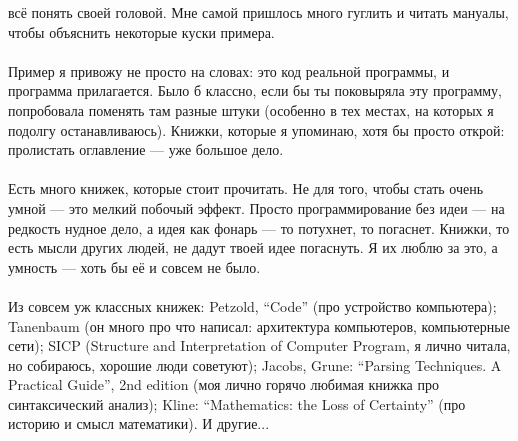 \documentclass[11pt]{book}
\begin{document}
всё понять своей головой.
Мне самой пришлось много гуглить и читать мануалы, чтобы объяснить некоторые куски примера.
\\ \\
Пример я привожу не просто на словах: это код реальной программы, и программа прилагается.
Было б классно, если бы ты поковыряла эту программу, попробовала поменять там разные штуки
(особенно в тех местах, на которых я подолгу останавливаюсь).
Книжки, которые я упоминаю, хотя бы просто открой: пролистать оглавление --- уже большое дело.
\\ \\
Есть много книжек, которые стоит прочитать.
Не для того, чтобы стать очень умной --- это мелкий побочый эффект.
Просто программирование без идеи --- на редкость нудное дело, а идея как фонарь --- то потухнет, то погаснет.
Книжки, то есть мысли других людей, не дадут твоей идее погаснуть.
Я их люблю за это, а умность --- хоть бы её и совсем не было.
\\ \\
Из совсем уж классных книжек:
Petzold, ``Code'' (про устройство компьютера);
Tanenbaum (он много про что написал: архитектура компьютеров, компьютерные сети);
SICP (Structure and Interpretation of Computer Program, я лично читала, но собираюсь, хорошие люди советуют);
Jacobs, Grune: ``Parsing Techniques. A Practical Guide'', 2nd edition (моя лично горячо любимая книжка про синтаксический анализ);
Kline: ``Mathematics: the Loss of Certainty'' (про историю и смысл математики).
И другие...

\tableofcontents
\end{document}
